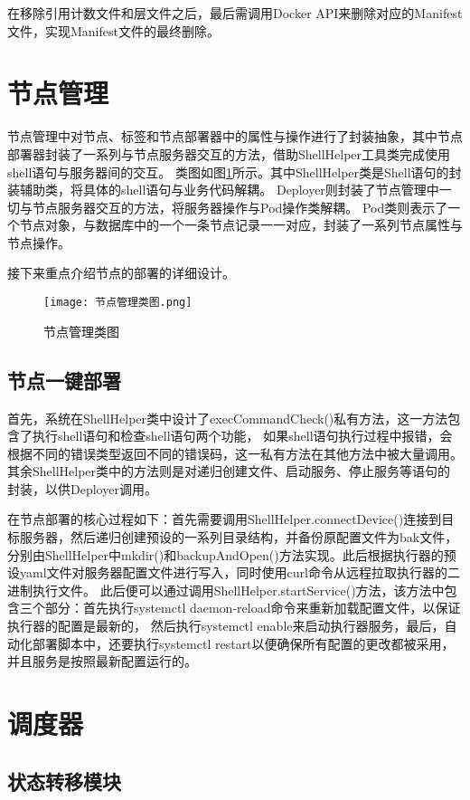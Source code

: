 在移除引用计数文件和层文件之后，最后需调用Docker API来删除对应的Manifest文件，实现Manifest文件的最终删除。


\section{节点管理}
节点管理中对节点、标签和节点部署器中的属性与操作进行了封装抽象，其中节点部署器封装了一系列与节点服务器交互的方法，借助ShellHelper工具类完成使用shell语句与服务器间的交互。
类图如图\ref{fig:节点管理类图}所示。其中ShellHelper类是Shell语句的封装辅助类，将具体的shell语句与业务代码解耦。
Deployer则封装了节点管理中一切与节点服务器交互的方法，将服务器操作与Pod操作类解耦。
Pod类则表示了一个节点对象，与数据库中的一个一条节点记录一一对应，封装了一系列节点属性与节点操作。

接下来重点介绍节点的部署的详细设计。

\begin{figure}[h]
  \centering
  \texttt{[image: 节点管理类图.png]}
  \caption{节点管理类图}
  \label{fig:节点管理类图}
\end{figure}

\subsection{节点一键部署}
首先，系统在ShellHelper类中设计了execCommandCheck()私有方法，这一方法包含了执行shell语句和检查shell语句两个功能，
如果shell语句执行过程中报错，会根据不同的错误类型返回不同的错误码，这一私有方法在其他方法中被大量调用。
其余ShellHelper类中的方法则是对递归创建文件、启动服务、停止服务等语句的封装，以供Deployer调用。

在节点部署的核心过程如下：首先需要调用ShellHelper.connectDevice()连接到目标服务器，然后递归创建预设的一系列目录结构，并备份原配置文件为bak文件，
分别由ShellHelper中mkdir()和backupAndOpen()方法实现。此后根据执行器的预设yaml文件对服务器配置文件进行写入，同时使用curl命令从远程拉取执行器的二进制执行文件。
此后便可以通过调用ShellHelper.startService()方法，该方法中包含三个部分：首先执行systemctl daemon-reload命令来重新加载配置文件，以保证执行器的配置是最新的，
然后执行systemctl enable来启动执行器服务，最后，自动化部署脚本中，还要执行systemctl restart以便确保所有配置的更改都被采用，并且服务是按照最新配置运行的。

\section{调度器}

\subsection{状态转移模块}

